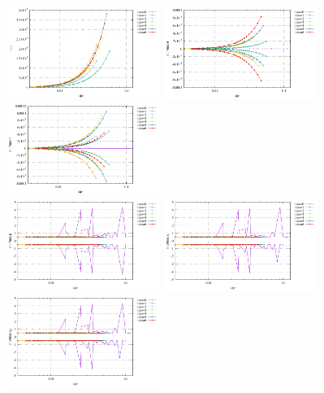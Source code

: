 \begin{center}
\includegraphics[width=5cm]{python_codes/fieldstone_78/results/vrms_exp4.pdf} 
\includegraphics[width=5cm]{python_codes/fieldstone_78/results/stats_u_exp4.pdf}
\includegraphics[width=5cm]{python_codes/fieldstone_78/results/stats_v_exp4.pdf}\\
\includegraphics[width=5cm]{python_codes/fieldstone_78/results/stats_p_exp4.pdf}
\includegraphics[width=5cm]{python_codes/fieldstone_78/results/stats_q1_exp4.pdf}
\includegraphics[width=5cm]{python_codes/fieldstone_78/results/stats_q2_exp4.pdf}
\end{center}

